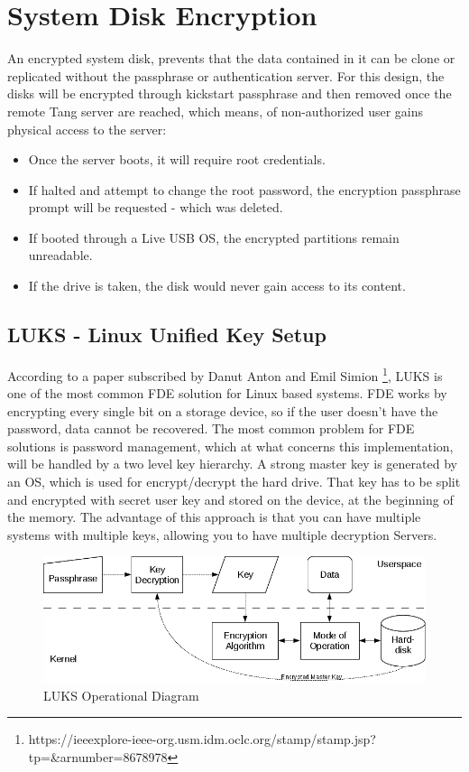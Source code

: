 \section{System Disk Encryption}
An encrypted system disk, prevents that the data contained in it can be clone or replicated without the passphrase or authentication server. For this design, the disks will be encrypted through kickstart passphrase and then removed once the remote Tang server are reached, which means, of non-authorized user gains physical access to the server:
\begin{itemize}
  \item Once the server boots, it will require root credentials.
  \item If halted and attempt to change the root password, the encryption passphrase prompt will be requested - which was deleted.
  \item If booted through a Live USB OS, the encrypted partitions remain unreadable.
  \item If the drive is taken, the disk would never gain access to its content.
\end{itemize}

\newpage
\subsection{LUKS - Linux Unified Key Setup}

According to a paper subscribed by Danut Anton and Emil Simion \footnote[1]{https://ieeexplore-ieee-org.usm.idm.oclc.org/stamp/stamp.jsp?tp=\&arnumber=8678978}, LUKS is one of the most common FDE solution for Linux based systems.
FDE works by encrypting every single bit on a storage device, so if the user doesn't have the password, data cannot be recovered. The most common problem for FDE solutions is password management, which at what concerns this implementation, will be handled by a two level key hierarchy. A strong master key is generated by an OS, which is used for encrypt/decrypt the hard drive. That key has to be split and encrypted with secret user key and stored on the device, at the beginning of the memory. The advantage of this approach is that you can have multiple systems with multiple keys, allowing you to have multiple decryption Servers.

\vskip 2cm
\begin{figure}
  \includegraphics[width=14cm]{images/image2.png}
  \centering
  \caption{LUKS Operational Diagram}
\end{figure}

